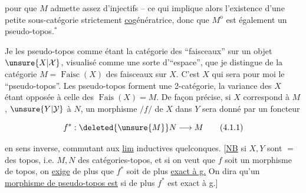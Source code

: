 
pour que $M$ admette assez d'injectifs -- ce qui implique alors l'existence d'une petite sous-catégorie strictement \uline{co}génératrice, donc que $M^{\mathrm{o}}$ est également un pseudo-topos.$^{*}$


Je  les  pseudo-topos comme étant la catégorie des ``faisceaux'' sur un objet $\unsure{X|\mathcal X}$, visualisé comme une sorte  d'``espace'', que je distingue de la catégorie $M=\operatorname{Faisc}(X)$ des faisceaux sur $X$.  C'est $X$ qui sera pour moi le ``pseudo-topos''. Les pseudo-topos forment une 2-catégorie, la variance des $X$ étant opposée à celle des  $\operatorname{Fais}(X)=M$.  De façon précise, si $X$ correspond à $M$, $\unsure{Y|\mathcal Y}$ à $N$, un morphisme $/f/$ de $X$ dans $Y$ sera donné par un foncteur


\[
f^{*}:\deleted{\unsure{M}}N\longrightarrow M
\tag*{(4.1.1)}
\]

en sens inverse, commutant  aux \uline{lim} inductives quelconques. [\uline{NB} si $X,Y$ sont $=$ des topos, i.e. $M,N$ des catégories-topos,  et si on veut que $f$ soit un morphisme de topos, on \uline{exige} de plus que $f^{*}$ soit de plus \uline{exact à g.} On dira qu'un \uline{morphisme de pseudo-topos est}  si de plus $f^{*}$ est exact à g.]
